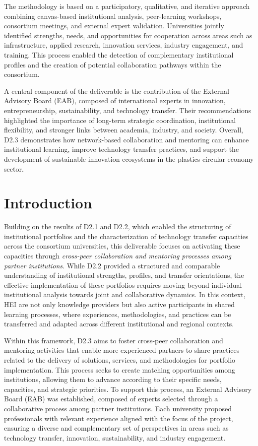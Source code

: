 \documentclass[
  12pt,
  oneside]{book}
\begin{document}
The methodology is based on a participatory, qualitative, and iterative
approach combining canvas-based institutional analysis, peer-learning
workshops, consortium meetings, and external expert validation.
Universities jointly identified strengths, needs, and opportunities for
cooperation across areas such as infrastructure, applied research,
innovation services, industry engagement, and training. This process
enabled the detection of complementary institutional profiles and the
creation of potential collaboration pathways within the consortium.

A central component of the deliverable is the contribution of the
External Advisory Board (EAB), composed of international experts in
innovation, entrepreneurship, sustainability, and technology transfer.
Their recommendations highlighted the importance of long-term strategic
coordination, institutional flexibility, and stronger links between
academia, industry, and society. Overall, D2.3 demonstrates how
network-based collaboration and mentoring can enhance institutional
learning, improve technology transfer practices, and support the
development of sustainable innovation ecosystems in the plastics
circular economy sector.

\chapter{Introduction}\label{introduction}

Building on the results of D2.1 and D2.2, which enabled the structuring
of institutional portfolios and the characterization of technology
transfer capacities across the consortium universities, this deliverable
focuses on activating these capacities through \emph{cross-peer
collaboration and mentoring processes among partner institutions}. While
D2.2 provided a structured and comparable understanding of institutional
strengths, profiles, and transfer orientations, the effective
implementation of these portfolios requires moving beyond individual
institutional analysis towards joint and collaborative dynamics. In this
context, HEI are not only knowledge providers but also active
participants in shared learning processes, where experiences,
methodologies, and practices can be transferred and adapted across
different institutional and regional contexts.

Within this framework, D2.3 aims to foster cross-peer collaboration and
mentoring activities that enable more experienced partners to share
practices related to the delivery of solutions, services, and
methodologies for portfolio implementation. This process seeks to create
matching opportunities among institutions, allowing them to advance
according to their specific needs, capacities, and strategic priorities.
To support this process, an External Advisory Board (EAB) was
established, composed of experts selected through a collaborative
process among partner institutions. Each university proposed
professionals with relevant experience aligned with the focus of the
project, ensuring a diverse and complementary set of perspectives in
areas such as technology transfer, innovation, sustainability, and
industry engagement.
\end{document}

